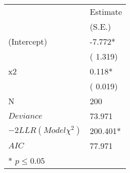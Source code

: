 \begin{center}
 \begin{tabular}{*{2}{l}}
 \hline
               & Estimate  \\
              & (S.E.)  \\
\hline 
 \hline
  (Intercept)   &    -7.772* \\
    &   ( 1.319) \\
  x2   &    0.118* \\
    &   ( 0.019) \\
 \hline 
N   &    200 \\
 $Deviance$      & 73.971  \\
 $-2LLR (Model \chi^2)$      & 200.401*  \\
 $AIC$      & 77.971  \\
 \hline\hline
* $p \le 0.05$\end{tabular}
\end{center}